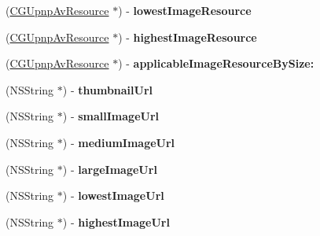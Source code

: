 \begin{DoxyCompactItemize}
\item 
\hypertarget{interface_c_g_upnp_av_item_afb12be309d5c51430363f9041260cb5b}{(\hyperlink{interface_c_g_upnp_av_resource}{C\-G\-Upnp\-Av\-Resource} $\ast$) -\/ {\bfseries lowest\-Image\-Resource}}\label{interface_c_g_upnp_av_item_afb12be309d5c51430363f9041260cb5b}

\item 
\hypertarget{interface_c_g_upnp_av_item_ab0aee827ae90ba5d60ff38a23720911a}{(\hyperlink{interface_c_g_upnp_av_resource}{C\-G\-Upnp\-Av\-Resource} $\ast$) -\/ {\bfseries highest\-Image\-Resource}}\label{interface_c_g_upnp_av_item_ab0aee827ae90ba5d60ff38a23720911a}

\item 
\hypertarget{interface_c_g_upnp_av_item_a543b3fb5ae033289e323f98409fe2e6f}{(\hyperlink{interface_c_g_upnp_av_resource}{C\-G\-Upnp\-Av\-Resource} $\ast$) -\/ {\bfseries applicable\-Image\-Resource\-By\-Size\-:}}\label{interface_c_g_upnp_av_item_a543b3fb5ae033289e323f98409fe2e6f}

\item 
\hypertarget{interface_c_g_upnp_av_item_a8cf0de2d9ff53c09ed4d7abd81fdf8a2}{(N\-S\-String $\ast$) -\/ {\bfseries thumbnail\-Url}}\label{interface_c_g_upnp_av_item_a8cf0de2d9ff53c09ed4d7abd81fdf8a2}

\item 
\hypertarget{interface_c_g_upnp_av_item_aa4ca8f81ea9c65f718955b7b7568eea2}{(N\-S\-String $\ast$) -\/ {\bfseries small\-Image\-Url}}\label{interface_c_g_upnp_av_item_aa4ca8f81ea9c65f718955b7b7568eea2}

\item 
\hypertarget{interface_c_g_upnp_av_item_a8d46a1a37b8d9542bd4f5554b4cedb6b}{(N\-S\-String $\ast$) -\/ {\bfseries medium\-Image\-Url}}\label{interface_c_g_upnp_av_item_a8d46a1a37b8d9542bd4f5554b4cedb6b}

\item 
\hypertarget{interface_c_g_upnp_av_item_a596441d41d8f8b1a0bdd0ad7f8325dc8}{(N\-S\-String $\ast$) -\/ {\bfseries large\-Image\-Url}}\label{interface_c_g_upnp_av_item_a596441d41d8f8b1a0bdd0ad7f8325dc8}

\item 
\hypertarget{interface_c_g_upnp_av_item_a4e2e0c7aeeea6e6683c624caec37e74f}{(N\-S\-String $\ast$) -\/ {\bfseries lowest\-Image\-Url}}\label{interface_c_g_upnp_av_item_a4e2e0c7aeeea6e6683c624caec37e74f}

\item 
\hypertarget{interface_c_g_upnp_av_item_a0998d888fa1cbc47d3bd3d2633137df5}{(N\-S\-String $\ast$) -\/ {\bfseries highest\-Image\-Url}}\label{interface_c_g_upnp_av_item_a0998d888fa1cbc47d3bd3d2633137df5}


\end{DoxyCompactItemize}
